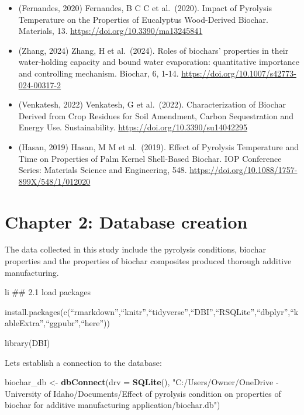 \documentclass[
]{article}
\newenvironment{Shaded}{\begin{snugshade}}{\end{snugshade}}
\newcommand{\AttributeTok}[1]{\textcolor[rgb]{0.13,0.29,0.53}{#1}}
\newcommand{\FunctionTok}[1]{\textcolor[rgb]{0.13,0.29,0.53}{\textbf{#1}}}
\newcommand{\NormalTok}[1]{#1}
\newcommand{\OtherTok}[1]{\textcolor[rgb]{0.56,0.35,0.01}{#1}}
\newcommand{\StringTok}[1]{\textcolor[rgb]{0.31,0.60,0.02}{#1}}
\begin{document}
\begin{itemize}
  temperature on the characterization of biochars derived from biomass.
  Energy Sources, Part A: Recovery, Utilization, and Environmental
  Effects, 39, 933 - 940.
  \url{https://doi.org/10.1080/15567036.2016.1276650}
\item
  (Fernandes, 2020) Fernandes, B C C et al.~(2020). Impact of Pyrolysis
  Temperature on the Properties of Eucalyptus Wood-Derived Biochar.
  Materials, 13. \url{https://doi.org/10.3390/ma13245841}
\item
  (Zhang, 2024) Zhang, H et al.~(2024). Roles of biochars' properties in
  their water-holding capacity and bound water evaporation: quantitative
  importance and controlling mechanism. Biochar, 6, 1-14.
  \url{https://doi.org/10.1007/s42773-024-00317-2}
\item
  (Venkatesh, 2022) Venkatesh, G et al.~(2022). Characterization of
  Biochar Derived from Crop Residues for Soil Amendment, Carbon
  Sequestration and Energy Use. Sustainability.
  \url{https://doi.org/10.3390/su14042295}
\item
  (Hasan, 2019) Hasan, M M et al.~(2019). Effect of Pyrolysis
  Temperature and Time on Properties of Palm Kernel Shell-Based Biochar.
  IOP Conference Series: Materials Science and Engineering, 548.
  \url{https://doi.org/10.1088/1757-899X/548/1/012020}
\end{itemize}

\section{Chapter 2: Database
creation}\label{chapter-2-database-creation}

The data collected in this study include the pyrolysis conditions,
biochar properties and the properties of biochar composites produced
thorough additive manufacturing.

li \#\# 2.1 load packages

install.packages(c(``rmarkdown'',``knitr'',``tidyverse'',``DBI'',``RSQLite'',``dbplyr'',``kableExtra'',``ggpubr'',``here''))

library(DBI)

Lets establish a connection to the database:

\begin{Shaded}
\begin{Highlighting}[]
\NormalTok{biochar\_db }\OtherTok{\textless{}{-}} \FunctionTok{dbConnect}\NormalTok{(}\AttributeTok{drv =} \FunctionTok{SQLite}\NormalTok{(),}
                        \StringTok{"C:/Users/Owner/OneDrive {-} University of Idaho/Documents/Effect of pyrolysis condition on properties of biochar for additive manufacturing application/biochar.db"}\NormalTok{)}
\end{Highlighting}
\end{Shaded}
\end{document}
